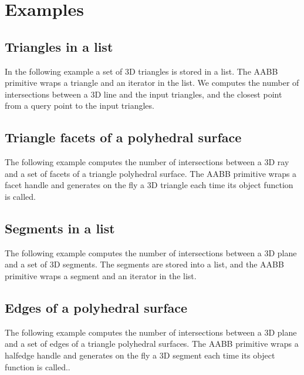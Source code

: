 \section{Examples}
\label{AABB_tree_section_examples}

\subsection{Triangles in a list}
In the following example a set of 3D triangles is stored in a list. The AABB primitive wraps a triangle and an iterator in the list. We computes the number of intersections between a 3D line and the input triangles, and the closest point from a query point to the input triangles.

\subsection{Triangle facets of a polyhedral surface}
The following example computes the number of intersections between a 3D ray and a set of facets of a triangle polyhedral surface. The AABB primitive wraps a facet handle and generates on the fly a 3D triangle each time its object function is called.

\subsection{Segments in a list}
The following example computes the number of intersections between a 3D plane and a set of 3D segments. The segments are stored into a list, and the AABB primitive wraps a segment and an iterator in the list.

\subsection{Edges of a polyhedral surface}
The following example computes the number of intersections between a 3D plane and a set of edges of a triangle polyhedral surfaces. The AABB primitive wraps a halfedge handle and generates on the fly a 3D segment each time its object function is called..
